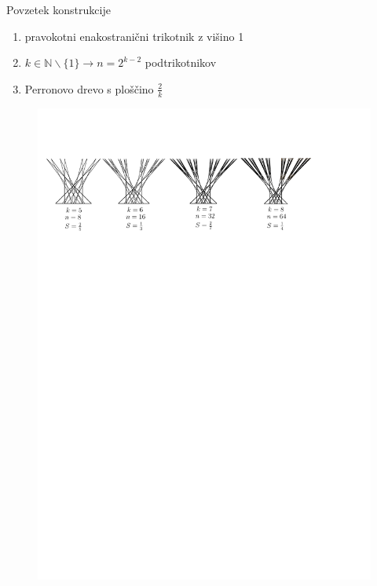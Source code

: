 \documentclass{beamer}
\begin{document}
\begin{frame}{Povzetek konstrukcije}
    \begin{enumerate}
        \item pravokotni enakostranični trikotnik z višino 1
        \item $ k \in \mathbb{N} \backslash \{1\} \rightarrow n = 2^{k-2} $ podtrikotnikov
        \item Perronovo drevo s ploščino $ \frac{2}{k} $
    \end{enumerate}
    \begin{figure}
        \centering
        \includegraphics[width=\textwidth]{ipe_slike/brstenje_k_n.pdf}
    \end{figure}
\end{frame}

\end{document}
